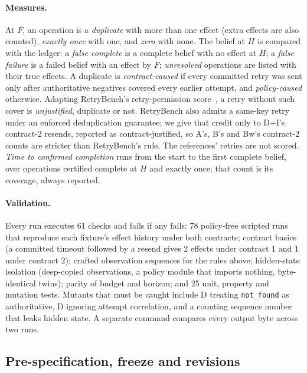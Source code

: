 \documentclass[11pt]{article}
\newcommand{\code}[1]{\texttt{#1}}
\begin{document}
\paragraph{Measures.} At $F$, an operation is a \emph{duplicate} with more than one effect (extra effects are also counted), \emph{exactly once} with one, and \emph{zero} with none. The belief at $H$ is compared with the ledger: a \emph{false complete} is a complete belief with no effect at $H$; a \emph{false failure} is a failed belief with an effect by $F$; \emph{unresolved} operations are listed with their true effects. A duplicate is \emph{contract-caused} if every committed retry was sent only after authoritative negatives covered every earlier attempt, and \emph{policy-caused} otherwise. Adapting RetryBench's retry-permission score~\cite{retrybench}, a retry without such cover is \emph{unjustified}, duplicate or not. RetryBench also admits a same-key retry under an enforced deduplication guarantee; we give that credit only to D+I's contract-2 resends, reported as contract-justified, so A's, B's and Bw's contract-2 counts are stricter than RetryBench's rule. The references' retries are not scored. \emph{Time to confirmed completion} runs from the start to the first complete belief, over operations certified complete at $H$ and exactly once; that count is its coverage, always reported.

\paragraph{Validation.} Every run executes 61 checks and fails if any fails: 78 policy-free scripted runs that reproduce each fixture's effect history under both contracts; contract basics (a committed timeout followed by a resend gives 2 effects under contract 1 and 1 under contract 2); crafted observation sequences for the rules above; hidden-state isolation (deep-copied observations, a policy module that imports nothing, byte-identical twins); parity of budget and horizon; and 25 unit, property and mutation tests. Mutants that must be caught include D treating \code{not\_found} as authoritative, D ignoring attempt correlation, and a counting sequence number that leaks hidden state. A separate command compares every output byte across two runs.

\subsection{Pre-specification, freeze and revisions}\label{sec:history}
\end{document}
